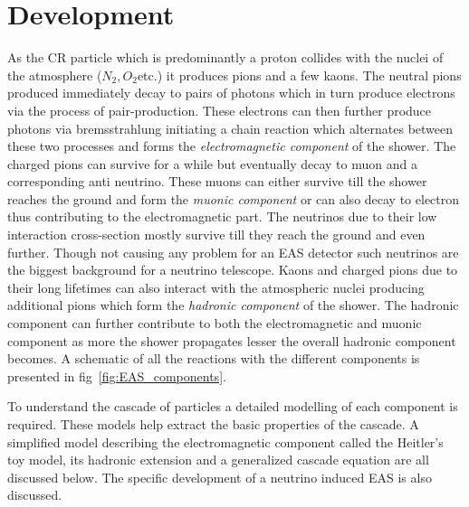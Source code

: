 \section{Development}
\label{sec:EAS_dev}

As the CR particle which is predominantly a proton collides with the nuclei of the atmosphere ($N_2, O_2 $etc.) it produces pions and a few kaons. The neutral pions produced immediately decay to pairs of photons which in turn produce electrons via the process of pair-production. These electrons can then further produce photons via bremsstrahlung initiating a chain reaction which alternates between these two processes and forms the \textit{electromagnetic component} of the shower. The charged pions can survive for a while but eventually decay to muon and a corresponding anti neutrino. These muons can either survive till the shower reaches the ground and form the \textit{muonic component} or can also decay to electron thus contributing to the electromagnetic part. The neutrinos due to their low interaction cross-section mostly survive till they reach the ground and even further. Though not causing any problem for an EAS detector such neutrinos are the biggest background for a neutrino telescope. Kaons and charged pions due to their long lifetimes can also interact with the atmospheric nuclei producing additional pions which form the \textit{hadronic component} of the shower. The hadronic component can further contribute to both the electromagnetic and muonic component as more the shower propagates lesser the overall hadronic component becomes. A schematic of all the reactions with the different components is presented in fig~\ref{fig:EAS_components}.

To understand the cascade of particles a detailed modelling of each component is required. These models help extract the basic properties of the cascade. A simplified model describing the electromagnetic component called the Heitler's toy model, its hadronic extension and a generalized cascade equation are all discussed below. The specific development of a neutrino induced EAS is also discussed.  


